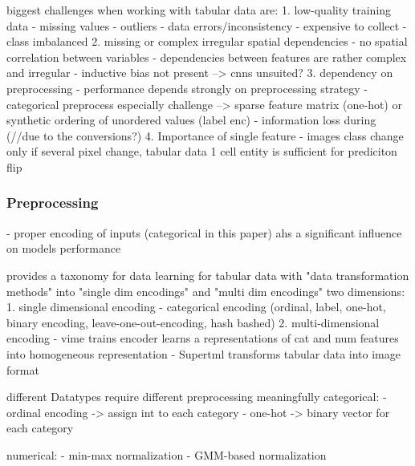 biggest challenges when working with tabular data are: \cite{borisov2022DeepNeuralNetworks}
    1. low-quality training data
        - missing values
        - outliers
        - data errors/inconsistency
        - expensive to collect
        - class imbalanced
    2. missing or complex irregular spatial dependencies
        - no spatial correlation between variables
        - dependencies between features are rather complex and irregular
        - inductive bias not present --> cnns unsuited? %
    3. dependency on preprocessing
        - performance depends strongly on preprocessing strategy \cite{gorishniy2022EmbeddingsNumericalFeatures}
        - categorical preprocess especially challenge --> sparse feature matrix (one-hot) or synthetic ordering of unordered values (label enc)
        - information loss during (//due to the conversions?) \cite{fitkov-norris2012EvaluatingImpactCategorical}
    4. Importance of single feature
        - images class change only if several pixel change, tabular data 1 cell entity is sufficient for prediciton flip



\subsubsection{Preprocessing}
\label{sec:preprocessing}

- proper encoding of inputs (categorical in this paper) ahs a significant influence on models performance \cite{norris2012EvaluatingImpactCategorical}

\cite{borisov2022DeepNeuralNetworks} provides a taxonomy for data learning for tabular data with "data transformation methods" into "single dim encodings" and "multi dim encodings" 
two dimensions:\cite{borisov2022DeepNeuralNetworks}
    1. single dimensional encoding
        - categorical encoding (ordinal, label, one-hot, binary encoding, leave-one-out-encoding, hash bashed) %
    2. multi-dimensional encoding 
        - vime trains encoder learns a representations of cat and num features into homogeneous representation
        - Supertml transforms tabular data into image format


different Datatypes require different preprocessing \cite{fan2020RelationalDataSynthesisa} meaningfully \cite{lederrey2022DATGANIntegratingExperta}
categorical:
- ordinal encoding -> assign int to each category
- one-hot -> binary vector for each category

numerical:
- min-max normalization
- GMM-based normalization

